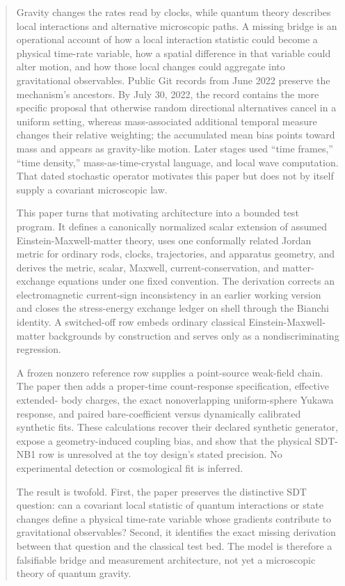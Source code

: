 \documentclass[
  american,
  11pt,
  letterpaper,
]{article}
\begin{document}
\begin{abstract}

Gravity changes the rates read by clocks, while quantum theory describes local interactions and alternative microscopic paths. A missing bridge is an operational account of how a local interaction statistic could become a physical time-rate variable, how a spatial difference in that variable could alter motion, and how those local changes could aggregate into gravitational observables. Public Git records from June 2022 preserve the mechanism's ancestors. By July 30, 2022, the record contains the more specific proposal that otherwise random directional alternatives cancel in a uniform setting, whereas mass-associated additional temporal measure changes their relative weighting; the accumulated mean bias points toward mass and appears as gravity-like motion. Later stages used ``time frames,'' ``time density,'' mass-as-time-crystal language, and local wave computation. That dated stochastic operator motivates this paper but does not by itself supply a covariant microscopic law.

This paper turns that motivating architecture into a bounded test program. It defines a canonically normalized scalar extension of assumed Einstein-Maxwell-matter theory, uses one conformally related Jordan metric for ordinary rods, clocks, trajectories, and apparatus geometry, and derives the metric, scalar, Maxwell, current-conservation, and matter-exchange equations under one fixed convention. The derivation corrects an electromagnetic current-sign inconsistency in an earlier working version and closes the stress-energy exchange ledger on shell through the Bianchi identity. A switched-off row embeds ordinary classical Einstein-Maxwell-matter backgrounds by construction and serves only as a nondiscriminating regression.

A frozen nonzero reference row supplies a point-source weak-field chain. The paper then adds a proper-time count-response specification, effective extended- body charges, the exact nonoverlapping uniform-sphere Yukawa response, and paired bare-coefficient versus dynamically calibrated synthetic fits. These calculations recover their declared synthetic generator, expose a geometry-induced coupling bias, and show that the physical SDT-NB1 row is unresolved at the toy design's stated precision. No experimental detection or cosmological fit is inferred.

The result is twofold. First, the paper preserves the distinctive SDT question: can a covariant local statistic of quantum interactions or state changes define a physical time-rate variable whose gradients contribute to gravitational observables? Second, it identifies the exact missing derivation between that question and the classical test bed. The model is therefore a falsifiable bridge and measurement architecture, not yet a microscopic theory of quantum gravity.

\end{abstract}
\end{document}
